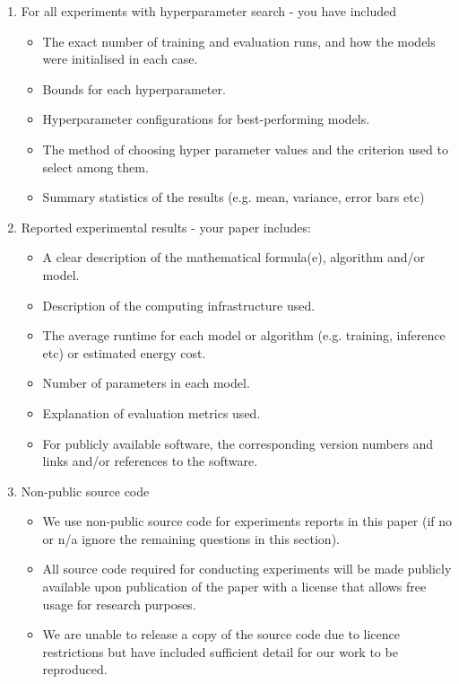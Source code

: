 \documentclass{INTERSPEECH2023}
\begin{document}
\begin{enumerate}
\item For all experiments with hyperparameter search - you have included
\begin{itemize}
\item The exact number of training and evaluation runs, and how the models were initialised in each case.
\item Bounds for each hyperparameter.
\item Hyperparameter configurations for best-performing models.
\item The method of choosing hyper parameter values and the criterion used to select among them.
\item Summary statistics of the results (e.g. mean, variance, error bars etc)
\end{itemize}

\item Reported experimental results - your paper includes:
\begin{itemize}
\item A clear description of the mathematical formula(e), algorithm and/or model.
\item Description of the computing infrastructure used.
\item The average runtime for each model or algorithm (e.g. training, inference etc) or estimated energy cost.
\item Number of parameters in each model.
\item Explanation of evaluation metrics used.
\item For publicly available software, the corresponding version numbers and links and/or references to the software.
\end{itemize}
   
\item Non-public source code
\begin{itemize}
\item We use non-public source code for experiments reports in this paper (if no or n/a ignore the remaining questions in this section).
\item All source code required for conducting experiments will be made publicly available upon publication of the paper with a license that allows free usage for research purposes.
\item We are unable to release a copy of the source code due to licence restrictions but have included sufficient detail for our work to be reproduced.
\end{itemize}


\end{enumerate}
\end{document}
